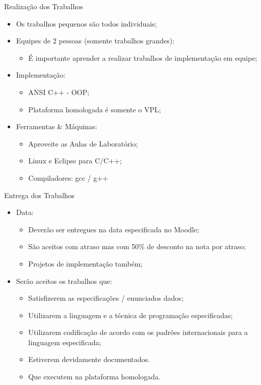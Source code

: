 \documentclass[12pt]{beamer}
\begin{document}
\begin{frame}{Realização dos Trabalhos}
\begin{itemize}
\item Os trabalhos pequenos são todos individuais;
\item Equipes de 2 pessoas (somente trabalhos grandes):
\begin{itemize}
\item É importante aprender a realizar trabalhos de implementação em equipe;
\end{itemize}
\item Implementação:
\begin{itemize}
\item ANSI C++ - OOP;
\item Plataforma homologada é somente o VPL;
\end{itemize}
\item Ferramentas \& Máquinas:
\begin{itemize}
\item Aproveite as Aulas de Laboratório;
\item Linux e Eclipse para C/C++;
\item Compiladores: gcc / g++
\end{itemize}
\end{itemize}
\end{frame}

\begin{frame}{Entrega dos Trabalhos}
\begin{itemize}
\item Data:
\begin{itemize}
\item Deverão ser entregues na data especificada no Moodle;
\item São aceitos com atraso mas com 50\% de desconto na nota por atraso;
\item Projetos de implementação também;
\end{itemize}
\item Serão aceitos os trabalhos que:
\begin{itemize}
\item Satisfizerem as especificações / enunciados dados;
\item Utilizarem a linguagem e a técnica de programação especificadas;
\item Utilizarem codificação de acordo com os padrões internacionais para a linguagem especificada;
\item Estiverem devidamente documentados.
\item Que executem na plataforma homologada.
\end{itemize}
\end{itemize}
\end{frame}
\end{document}
